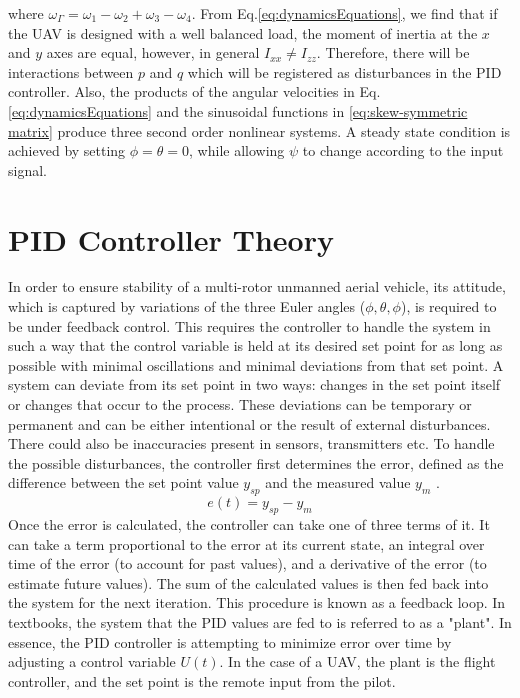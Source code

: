 \documentclass[11pt]{ucthesis}
\begin{document}
where $\omega_{\Gamma} = \omega_1 - \omega_2 + \omega_3 - \omega_4$.
From Eq.\ref{eq:dynamicsEquations}, we find that if the UAV is designed with a well balanced load, the moment of inertia at the $x$ and $y$ axes are equal, however, in general $I_{xx} \neq I_{zz}$. Therefore, there will be interactions between $p$ and $q$ which will be registered as disturbances in the PID controller. Also, the products of the angular velocities in Eq.\ref{eq:dynamicsEquations} and the sinusoidal functions in \ref{eq:skew-symmetric matrix} produce three second order nonlinear systems. A steady state condition is achieved by setting $\phi = \theta = 0$, while allowing $\psi$ to change according to the input signal.
\clearpage
\chapter{PID Controller Theory}

In order to ensure stability of a multi-rotor unmanned aerial vehicle, its attitude, which is captured by variations of the three Euler angles ($\phi, \theta, \phi$), is required to be under feedback control. This requires the controller to handle the system in such a way that the control variable is held at its desired set point for as long as possible with minimal oscillations and minimal deviations from that set point. A system can deviate from its set point in two ways: changes in the set point itself or changes that occur to the process. These deviations can be temporary or permanent and can be either intentional or the result of external disturbances. There could also be inaccuracies present in sensors, transmitters etc. To handle the possible disturbances, the controller first determines the error, defined as the difference between the set point value $y_{sp}$ and the measured value $y_m$ \cite{wang2020pid}.
\begin{equation}
e(t) = y_{sp} - y_m
\end{equation}
Once the error is calculated, the controller can take one of three terms of it. It can take a term proportional to the error at its current state, an integral over time of the error (to account for past values), and a derivative of the error (to estimate future values). The sum of the calculated values is then fed back into the system for the next iteration. This procedure is known as a feedback loop. In textbooks, the system that the PID values are fed to is referred to as a "plant". In essence, the PID controller is attempting to minimize error over time by adjusting a control variable $U(t)$. In the case of a UAV, the plant is the flight controller, and the set point is the remote input from the pilot.
\end{document}
